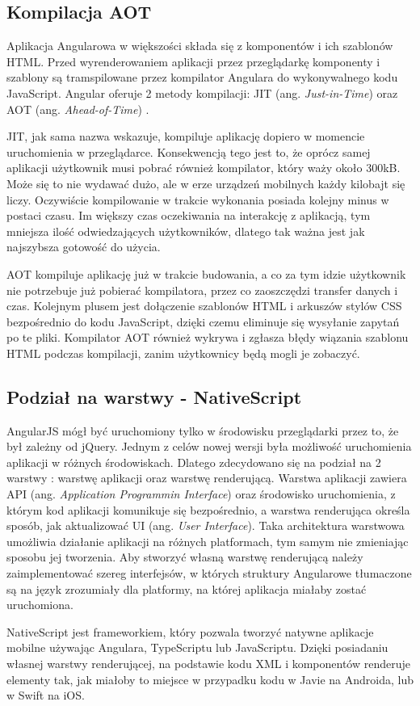 	\subsection{Kompilacja AOT}	
	Aplikacja Angularowa w większości składa się z komponentów i ich szablonów HTML. Przed wyrenderowaniem aplikacji przez przeglądarkę komponenty i szablony są tramspilowane przez kompilator Angulara do wykonywalnego kodu JavaScript. Angular oferuje 2 metody kompilacji: JIT (ang. \textit{Just-in-Time}) oraz AOT (ang. \textit{Ahead-of-Time}) \cite{angular-aot}.\par
	JIT, jak sama nazwa wskazuje, kompiluje aplikację dopiero w momencie uruchomienia w przeglądarce. Konsekwencją tego jest to, że oprócz samej aplikacji użytkownik musi pobrać również kompilator, który waży około 300kB. Może się to nie wydawać dużo, ale w erze urządzeń mobilnych każdy kilobajt się liczy. Oczywiście kompilowanie w trakcie wykonania posiada kolejny minus w postaci czasu. Im większy czas oczekiwania na interakcję z aplikacją, tym mniejsza ilość odwiedzających użytkowników, dlatego tak ważna jest jak najszybsza gotowość do użycia.\par
	AOT kompiluje aplikację już w trakcie budowania, a co za tym idzie użytkownik nie potrzebuje już pobierać kompilatora, przez co zaoszczędzi transfer danych i czas. Kolejnym plusem jest dołączenie szablonów HTML i arkuszów stylów CSS bezpośrednio do kodu JavaScript, dzięki czemu eliminuje się wysyłanie zapytań po te pliki. Kompilator AOT również wykrywa i zgłasza błędy wiązania szablonu HTML podczas kompilacji, zanim użytkownicy będą mogli je zobaczyć.
	
	\subsection{Podział na warstwy - NativeScript} \label{sec:angular-layers}
	AngularJS mógł być uruchomiony tylko w środowisku przeglądarki przez to, że był zależny od jQuery. Jednym z celów nowej wersji była możliwość uruchomienia aplikacji w różnych środowiskach. Dlatego zdecydowano się na podział na 2 warstwy \cite{angular-layers}: warstwę aplikacji oraz warstwę renderującą. Warstwa aplikacji zawiera API (ang. \textit{Application Programmin Interface}) oraz środowisko uruchomienia, z którym kod aplikacji komunikuje się bezpośrednio, a warstwa renderująca określa sposób, jak aktualizować UI (ang. \textit{User Interface}). Taka architektura warstwowa umożliwia działanie aplikacji na różnych platformach, tym samym nie zmieniając sposobu jej tworzenia. Aby stworzyć własną warstwę renderującą należy zaimplementować szereg interfejsów, w których struktury Angularowe tłumaczone są na język zrozumiały dla platformy, na której aplikacja miałaby zostać uruchomiona.\par
	NativeScript jest frameworkiem, który pozwala tworzyć natywne aplikacje mobilne używając Angulara, TypeScriptu lub JavaScriptu. Dzięki posiadaniu własnej warstwy renderującej, na podstawie kodu XML i komponentów renderuje elementy tak, jak miałoby to miejsce w przypadku kodu w Javie na Androida, lub w Swift na iOS.
	
